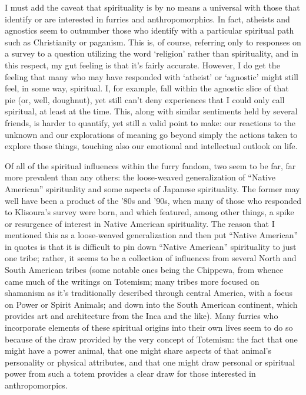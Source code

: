 I must add the caveat that spirituality is by no means a universal with those that identify or are interested in furries and anthropomorphics.  In fact, atheists and agnostics seem to outnumber those who identify with a particular spiritual path such as Christianity or paganism.  This is, of course, referring only to responses on a survey to a question utilizing the word `religion' rather than spirituality, and in this respect, my gut feeling is that it's fairly accurate.  However, I do get the feeling that many who may have responded with `atheist' or `agnostic' might still feel, in some way, spiritual.  I, for example, fall within the agnostic slice of that pie (or, well, doughnut), yet still can't deny experiences that I could only call spiritual, at least at the time.  This, along with similar sentiments held by several friends, is harder to quantify, yet still a valid point to make: our reactions to the unknown and our explorations of meaning go beyond simply the actions taken to explore those things, touching also our emotional and intellectual outlook on life.

Of all of the spiritual influences within the furry fandom, two seem to be far, far more prevalent than any others: the loose-weaved generalization of ``Native American'' spirituality and some aspects of Japanese spirituality.  The former may well have been a product of the '80s and '90s, when many of those who responded to Klisoura's survey were born, and which featured, among other things, a spike or resurgence of interest in Native American spirituality.  The reason that I mentioned this as a loose-weaved generalization and then put ``Native American'' in quotes is that it is difficult to pin down ``Native American'' spirituality to just one tribe; rather, it seems to be a collection of influences from several North and South American tribes (some notable ones being the Chippewa, from whence came much of the writings on Totemism; many tribes more focused on shamanism as it's traditionally described through central America, with a focus on Power or Spirit Animals; and down into the South American continent, which provides art and architecture from the Inca and the like).  Many furries who incorporate elements of these spiritual origins into their own lives seem to do so because of the draw provided by the very concept of Totemism: the fact that one might have a power animal, that one might share aspects of that animal's personality or physical attributes, and that one might draw personal or spiritual power from such a totem provides a clear draw for those interested in anthropomorpics.

